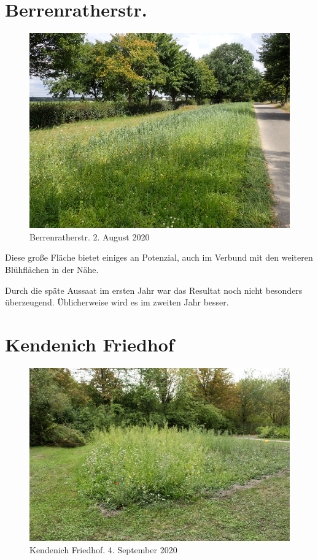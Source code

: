 \documentclass[10pt]{article}
\begin{document}
\section{Berrenratherstr.}
\begin{figure}[h!]
  \includegraphics[width=\linewidth]{img/berrenrather/august.jpg}
  \caption{Berrenratherstr. 2. August 2020}
\end{figure}

Diese große Fläche bietet einiges an Potenzial, auch im Verbund mit den weiteren Blühflächen in der Nähe.

Durch die späte Aussaat im ersten Jahr war das Resultat noch nicht besonders überzeugend. Üblicherweise wird es im zweiten Jahr besser.

\clearpage
\section{Kendenich Friedhof}
\begin{figure}[h!]
  \includegraphics[width=\linewidth]{img/kendenich/september.jpg}
  \caption{Kendenich Friedhof. 4. September 2020}
\end{figure}
\end{document}
